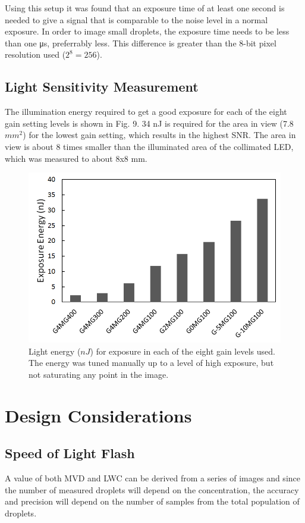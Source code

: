 Using this setup it was found that an exposure time of at least one second is needed to give a signal that is comparable to the noise level in a normal exposure. In order to image small droplets, the exposure time needs to be less than one μs, preferrably less. This difference is greater than the 8-bit pixel resolution used ($2^8=256$).

\subsection{Light Sensitivity Measurement}

The illumination energy required to get a good exposure for each of the eight gain setting levels is shown in Fig. 9. 34 nJ is required for the area in view (7.8 $mm^2$) for the lowest gain setting, which results in the highest SNR. The area in view is about 8 times smaller than the illuminated area of the collimated LED, which was measured to about 8x8 mm. 

\begin{figure}[ht]
\centering\includegraphics[width=0.75\linewidth]{figures/Energy_per_gain_level2}
\caption{Light energy ($nJ$) for exposure in each of the eight gain levels used. The energy was tuned manually up to a level of high exposure, but not saturating any point in the image.}
\end{figure}


\section{Design Considerations}

\subsection{Speed of Light Flash}

A value of both MVD and LWC can be derived from a series of images and since the number of measured droplets will depend on the concentration, the accuracy and precision will depend on the number of samples from the total population of droplets. 

